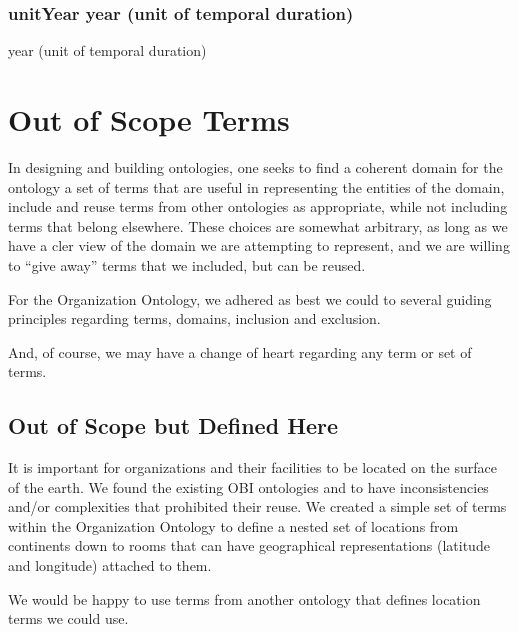 \documentclass[letterpaper,10pt,english]{sphinxmanual}
\begin{document}
\subsection{unitYear \sphinxhyphen{} year (unit of temporal duration)}
\label{\detokenize{doc-unitYear:unityear-year-unit-of-temporal-duration}}\label{\detokenize{doc-unitYear:index-0}}\label{\detokenize{doc-unitYear::doc}}
\begin{sphinxShadowBox}

\sphinxAtStartPar
year (unit of temporal duration)
\end{sphinxShadowBox}


\chapter{Out of Scope Terms}
\label{\detokenize{out-of-scope:out-of-scope-terms}}\label{\detokenize{out-of-scope::doc}}
\sphinxAtStartPar
In designing and building ontologies, one seeks to find a coherent domain for the
ontology \textendash{} a set of terms that are useful in representing the entities of the domain,
include and reuse terms from other ontologies as appropriate, while not including terms
that belong elsewhere.  These choices are somewhat arbitrary, as long as we have a
cler view of the domain we are attempting to represent, and we are willing to “give away”
terms that we included, but can be reused.

\sphinxAtStartPar
For the Organization Ontology, we adhered as best we could to several guiding principles
regarding terms, domains, inclusion and exclusion.

\sphinxAtStartPar
And, of course, we may have a change of heart regarding any term or set of terms.


\section{Out of Scope but Defined Here}
\label{\detokenize{out-of-scope:out-of-scope-but-defined-here}}
\begin{sphinxShadowBox}

\sphinxAtStartPar
It is important for organizations and their facilities to be located on the surface of
the earth.  We found the existing OBI ontologies  and  to have
inconsistencies
and/or complexities that prohibited their reuse.  We created a simple  set of terms
within
the Organization Ontology to define a nested set of locations from continents down
to rooms that can have geographical representations (latitude and longitude) attached
to them.

\sphinxAtStartPar
We would be happy to use terms from another ontology that defines location terms we
could use.
\end{sphinxShadowBox}
\end{document}
